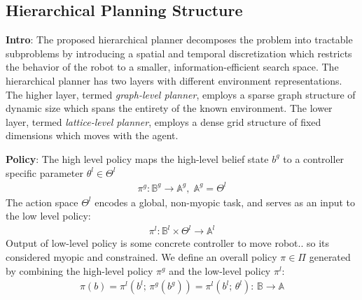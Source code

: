 \documentclass{article}
\newcommand{\ph}[1]{{\textbf{#1}:}} %
\begin{document}



\subsection{Hierarchical Planning Structure} 
\ph{Intro} The proposed hierarchical planner decomposes the problem into tractable subproblems by introducing a spatial and temporal discretization which restricts the behavior of the robot to a smaller, information-efficient search space. The hierarchical planner has two layers with different environment representations. The higher layer, termed \emph{graph-level planner}, employs a sparse graph structure of dynamic size which spans the entirety of the known environment. The lower layer, termed \emph{lattice-level planner}, employs a dense grid structure of fixed dimensions which moves with the agent. 

\ph{Policy} The high level policy maps the high-level belief state $b^g$ to a controller specific parameter $\theta^l \in \Theta^l$ 
\begin{align}
    \pi^g : \mathbb{B}^g \to \mathbb{A}^g, \; \mathbb{A}^g = \Theta^l
\end{align}
The action space $\Theta^l$ encodes a global, non-myopic task, and serves as an input to the low level policy: 
\begin{align}
    \pi^l: \mathbb{B}^l \times \Theta^l \to \mathbb{A}^l
\end{align}
Output of low-level policy is some concrete controller to move robot.. so its considered myopic and constrained. We define an overall policy $\pi \in \Pi$ generated by combining the high-level policy $\pi^g$ and the low-level policy $\pi^l$:
\begin{align}
    \pi(b) = \pi^l(b^l; \, \pi^g(b^g)) = \pi^l(b^l; \, \theta^l) : \, \mathbb{B}\rightarrow \mathbb{A} 
\end{align}
\end{document}
